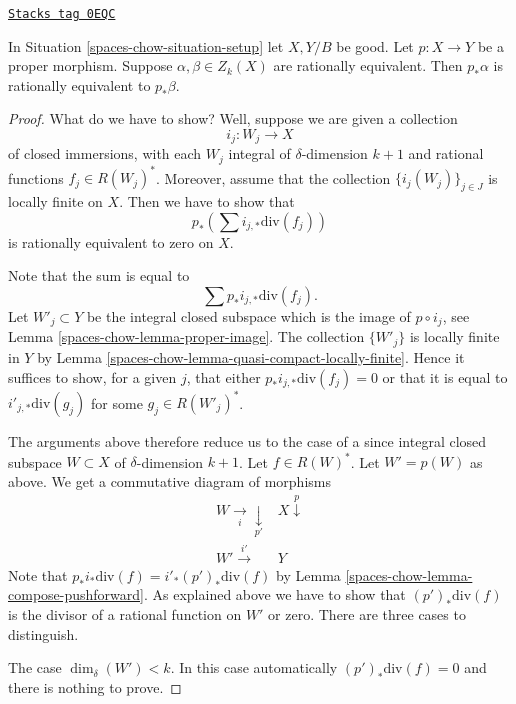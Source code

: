 \begin{lemma}
\label{spaces-chow-lemma-proper-pushforward-rational-equivalence}
\href{https://stacks.math.columbia.edu/tag/0EQC}{\texttt{Stacks tag 0EQC}}

In Situation \ref{spaces-chow-situation-setup} let $X, Y/B$ be good.
Let $p : X \to Y$ be a proper morphism.
Suppose $\alpha, \beta \in Z_k(X)$ are rationally equivalent.
Then $p_*\alpha$ is rationally equivalent to $p_*\beta$.
\end{lemma}

\begin{proof}
What do we have to show? Well, suppose we are given a collection
$$
i_j : W_j \longrightarrow X
$$
of closed immersions, with each $W_j$ integral of $\delta$-dimension $k + 1$
and rational functions $f_j \in R(W_j)^*$.
Moreover, assume that
the collection $\{i_j(W_j)\}_{j \in J}$ is locally finite on $X$.
Then we have to show that
$$
p_*\left(\sum i_{j, *}\text{div}(f_j)\right)
$$
is rationally equivalent to zero on $X$.

\medskip\noindent
Note that the sum is equal to
$$
\sum p_*i_{j, *}\text{div}(f_j).
$$
Let $W'_j \subset Y$ be the integral closed subspace which is the
image of $p \circ i_j$, see Lemma \ref{spaces-chow-lemma-proper-image}.
The collection $\{W'_j\}$ is locally finite
in $Y$ by Lemma \ref{spaces-chow-lemma-quasi-compact-locally-finite}.
Hence it suffices to show, for a given $j$, that either
$p_*i_{j, *}\text{div}(f_j) = 0$ or that it
is equal to $i'_{j, *}\text{div}(g_j)$ for some $g_j \in R(W'_j)^*$.

\medskip\noindent
The arguments above therefore reduce us to the case of a since
integral closed subspace $W \subset X$ of $\delta$-dimension $k + 1$.
Let $f \in R(W)^*$. Let $W' = p(W)$ as above.
We get a commutative diagram of morphisms
$$
\begin{array}{cc}W \underset{i}{\longrightarrow}\underset{p'}{\downarrow} & X \overset{p}{\downarrow} \\ W' \overset{i'}{\longrightarrow} & Y\end{array}
$$
Note that $p_*i_*\text{div}(f) = i'_*(p')_*\text{div}(f)$ by
Lemma \ref{spaces-chow-lemma-compose-pushforward}. As explained above
we have to show that $(p')_*\text{div}(f)$
is the divisor of a rational function on $W'$ or zero.
There are three cases to distinguish.

\medskip\noindent
The case $\dim_\delta(W') < k$. In this case automatically
$(p')_*\text{div}(f) = 0$ and there is nothing to prove.


\end{proof}
